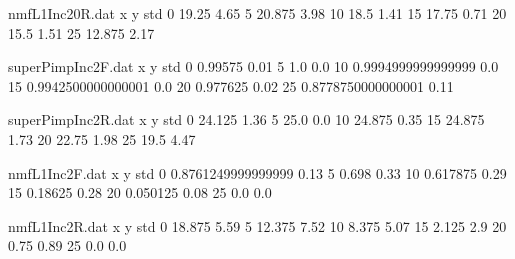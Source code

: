 \begin{filecontents}{nmfL1Inc20R.dat}
x y std
0 19.25 4.65
5 20.875 3.98
10 18.5 1.41
15 17.75 0.71
20 15.5 1.51
25 12.875 2.17
\end{filecontents}
\begin{filecontents}{superPimpInc2F.dat}
x y std
0 0.99575 0.01
5 1.0 0.0
10 0.9994999999999999 0.0
15 0.9942500000000001 0.0
20 0.977625 0.02
25 0.8778750000000001 0.11
\end{filecontents}
\begin{filecontents}{superPimpInc2R.dat}
x y std
0 24.125 1.36
5 25.0 0.0
10 24.875 0.35
15 24.875 1.73
20 22.75 1.98
25 19.5 4.47
\end{filecontents}
\begin{filecontents}{nmfL1Inc2F.dat}
x y std
0 0.8761249999999999 0.13
5 0.698 0.33
10 0.617875 0.29
15 0.18625 0.28
20 0.050125 0.08
25 0.0 0.0
\end{filecontents}
\begin{filecontents}{nmfL1Inc2R.dat}
x y std
0 18.875 5.59
5 12.375 7.52
10 8.375 5.07
15 2.125 2.9
20 0.75 0.89
25 0.0 0.0
\end{filecontents}